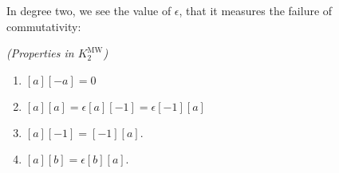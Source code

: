 \documentclass[11pt,openany]{book}
\providecommand{\MW}{\mathrm{MW}}
\begin{document}
In degree two, we see the value of $\epsilon$, that it measures the failure of commutativity:

\begin{proposition}\label{prop:properties-KMW2}  \textit{(Properties in $K_2^\MW$)}
\begin{enumerate}
    \item\label{KMW:bracket-times-bracket-negative}
    $[a][-a] = 0$
    \item\label{KMW:square-bracket-times-itself}
    $[a][a] = \epsilon[a][-1] = \epsilon[-1][a]$
    \item\label{KMW:bracket-a-bracket-minus-one}
    $[a][-1] = [-1][a]$.
    \item $[a][b] = \epsilon[b][a]$.
\end{enumerate}
\end{proposition}
\end{document}
